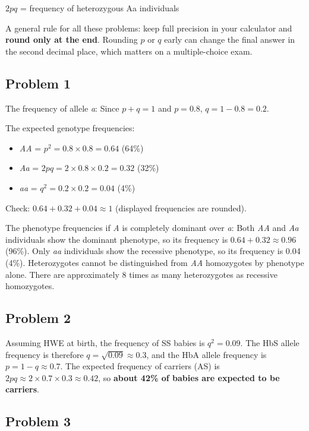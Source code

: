 \documentclass[
  a4paper]{book}
\providecommand{\tightlist}{%
  \setlength{\itemsep}{0pt}\setlength{\parskip}{0pt}}
\begin{document}
\(2pq\) = frequency of heterozygous Aa individuals

A general rule for all these problems: keep full precision in your calculator and \textbf{round only at the end}. Rounding \(p\) or \(q\) early can change the final answer in the second decimal place, which matters on a multiple-choice exam.

\subsection{Problem 1}\label{problem-1}

The frequency of allele \emph{a}: Since \(p + q = 1\) and \(p = 0.8\), \(q = 1 - 0.8 = 0.2\).

The expected genotype frequencies:

\begin{itemize}
\tightlist
\item
  \emph{AA} = \(p^2 = 0.8 \times 0.8 = 0.64\) (64\%)
\item
  \emph{Aa} = \(2pq = 2 \times 0.8 \times 0.2 = 0.32\) (32\%)
\item
  \emph{aa} = \(q^2 = 0.2 \times 0.2 = 0.04\) (4\%)
\end{itemize}

Check: \(0.64 + 0.32 + 0.04 \approx 1\) (displayed frequencies are rounded).

The phenotype frequencies if \emph{A} is completely dominant over \emph{a}: Both \emph{AA} and \emph{Aa} individuals show the dominant phenotype, so its frequency is \(0.64 + 0.32 \approx 0.96\) (96\%). Only \emph{aa} individuals show the recessive phenotype, so its frequency is 0.04 (4\%). Heterozygotes cannot be distinguished from \emph{AA} homozygotes by phenotype alone. There are approximately 8 times as many heterozygotes as recessive homozygotes.

\subsection{Problem 2}\label{problem-2}

Assuming HWE at birth, the frequency of SS babies is \(q^2 = 0.09\). The HbS allele frequency is therefore \(q = \sqrt{0.09} \approx 0.3\), and the HbA allele frequency is \(p = 1 - q \approx 0.7\). The expected frequency of carriers (AS) is \(2pq \approx 2 \times 0.7 \times 0.3 \approx 0.42\), so \textbf{about 42\% of babies are expected to be carriers}.

\subsection{Problem 3}\label{problem-3}
\end{document}
